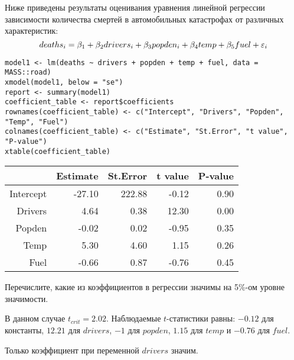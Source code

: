\begin{problem} %
Ниже приведены результаты оценивания уравнения линейной регрессии зависимости количества смертей в автомобильных катастрофах от различных характеристик:
\[
deaths_i = \beta_1 + \beta_2 drivers_i + \beta_3 popden_i + \beta_4  temp + \beta_5 fuel + \varepsilon_i
\]
\begin{verbatim}
model1 <- lm(deaths ~ drivers + popden + temp + fuel, data = MASS::road)
xmodel(model1, below = "se")
report <- summary(model1)
coefficient_table <- report$coefficients
rownames(coefficient_table) <- c("Intercept", "Drivers", "Popden", "Temp", "Fuel")
colnames(coefficient_table) <- c("Estimate", "St.Error", "t value", "P-value")
xtable(coefficient_table)
\end{verbatim}

\begin{tabular}{rrrrr}
  \hline
 & Estimate & St.Error & t value & P-value \\
  \hline
Intercept & -27.10 & 222.88 & -0.12 & 0.90 \\
  Drivers & 4.64 & 0.38 & 12.30 & 0.00 \\
  Popden & -0.02 & 0.02 & -0.95 & 0.35 \\
  Temp & 5.30 & 4.60 & 1.15 & 0.26 \\
  Fuel & -0.66 & 0.87 & -0.76 & 0.45 \\
   \hline
\end{tabular}


Перечислите, какие из коэффициентов в регрессии значимы на 5\%-ом уровне значимости.

\begin{sol}
В данном случае $t_{crit} = 2.02$. Наблюдаемые $t$-статистики равны: 
$-0.12$ для константы, $12.21$ для $drivers$, $-1$ для $popden$, $1.15$ для $temp$ и $-0.76$ для $fuel$.

Только коэффициент при переменной $drivers$ значим.
\end{sol}
\end{problem}



